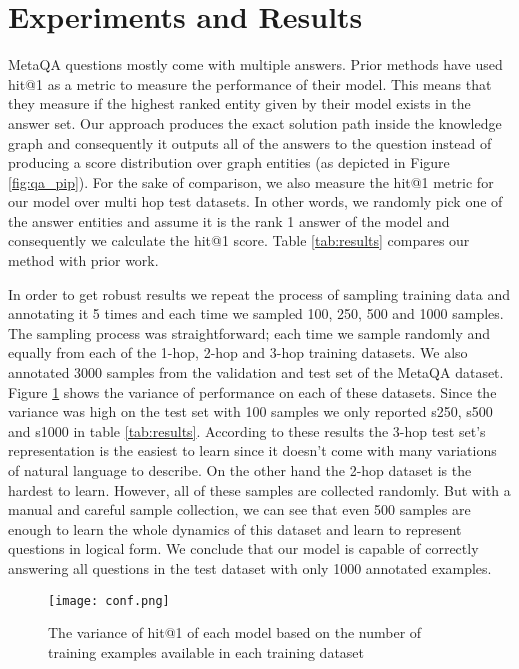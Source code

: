 \documentclass[11pt]{article}
\begin{document}
\section{Experiments and Results}
MetaQA questions mostly come with multiple answers. Prior methods have used hit@1 as a metric to measure the performance of their model. This means that they measure if the highest ranked entity given by their model exists in the answer set. Our approach produces the exact solution path inside the knowledge graph and consequently it outputs all of the answers to the question instead of producing a score distribution over graph entities (as depicted in Figure \ref{fig:qa_pip}). For the sake of comparison, we also measure the hit@1 metric for our model over multi hop test datasets. In other words, we randomly pick one of the answer entities and assume it is the rank 1 answer of the model and consequently we calculate the hit@1 score. Table \ref{tab:results} compares our method with prior work. 

In order to get robust results we repeat the process of sampling training data and annotating it 5 times and each time we sampled 100, 250, 500 and 1000 samples. The sampling process was straightforward; each time we sample randomly and equally from each of the 1-hop, 2-hop and 3-hop training datasets. We also annotated 3000 samples from the validation and test set of the MetaQA dataset. Figure \ref{fig:conf} shows the variance of performance on each of these datasets. Since the variance was high on the test set with 100 samples we only reported s250, s500 and s1000 in table \ref{tab:results}. According to these results the 3-hop test set's representation is the easiest to learn since it doesn't come with many variations of natural language to describe. On the other hand the 2-hop dataset is the hardest to learn. However, all of these samples are collected randomly. But with a manual and careful sample collection, we can see that even 500 samples are enough to learn the whole dynamics of this dataset and learn to represent questions in logical form. We conclude that our model is capable of correctly answering all questions in the test dataset with only 1000 annotated examples.




\begin{figure}[!htb]
  \centering
  \texttt{[image: conf.png]}
  \caption{The variance of hit@1 of each model based on the number of training examples available in each training dataset}
  \label{fig:conf}
\end{figure}
\end{document}
